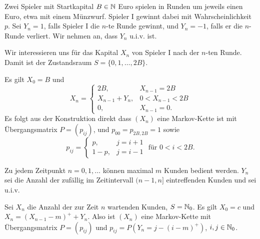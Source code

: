 \documentclass[a4paper,twoside,DIV15,BCOR12mm]{scrbook}
\begin{document}
\begin{beispiel}[Ruinspiel]
Zwei Spieler mit Startkapital $B\in\mathbb{N}$ Euro spielen in Runden um jeweils einen Euro, etwa mit einem Münzwurf. Spieler I gewinnt dabei mit Wahrscheinlichkeit $p$. Sei $Y_n = 1$, falls Spieler I die $n$-te Runde gewinnt, und $Y_n= -1$, falls er die $n$-Runde verliert. Wir nehmen an, dass $Y_n$ u.i.v. ist.

Wir interessieren uns für das Kapital $X_n$ von Spieler I nach der $n$-ten Runde. Damit ist der Zustandsraum $S=\{0,1,\ldots,2B\}$.

Es gilt $X_0 = B$ und
\[
X_n = 
\begin{cases}
2B, &X_{n-1} = 2B \\
X_{n-1} + Y_n, & 0 < X_{n-1} < 2B \\
0, &X_{n-1} = 0.
\end{cases}
\]
Es folgt aus der Konstruktion direkt dass $(X_n)$ eine Markov-Kette ist mit Übergangsmatrix $P=(p_{ij})$, und
$p_{00} = p_{2B,2B} = 1$ sowie
\[
p_{ij} = 
\begin{cases}
p, &j=i+1\\
1-p, &j=i-1 
\end{cases}\text{ für } 0<i<2B.
\]
\begin{center}
\end{center}
\end{beispiel}

\begin{beispiel}[Wartesystem]
Zu jedem Zeitpunkt $n=0,1,\ldots$ können maximal $m$ Kunden bedient werden. $Y_n$ sei die Anzahl der zufällig im Zeitintervall $(n-1,n]$ eintreffenden Kunden und sei u.i.v.

Sei $X_n$ die Anzahl der zur Zeit $n$ wartenden Kunden, $S=\mathbb{N}_0$. Es gilt $X_0 = c$ und $X_n = (X_{n-1}-m)^+ + Y_n$. Also ist $(X_n)$ eine Markov-Kette mit Übergangsmatrix $P=(p_{ij})$ und $p_{ij} = P(Y_n = j-(i-m)^+)$, $i,j\in \mathbb{N}_0$.
\end{beispiel}
\end{document}
